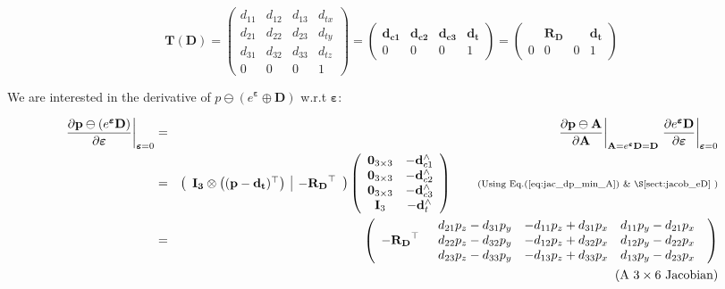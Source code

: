 \documentclass[a4paper,11pt]{report}
\newcommand{\E}{{\bm{\varepsilon}}}
\newcommand{\hatop}[1]{#1^\wedge}
\begin{document}
\begin{equation}
\mathbf{T}(\mathbf{D}) =
\left(
\begin{array}{ccc|c}
 d_{11} & d_{12} & d_{13} & d_{tx}   \\
 d_{21} & d_{22} & d_{23} & d_{ty}   \\
 d_{31} & d_{32} & d_{33} & d_{tz}   \\
\hline
  0 & 0 & 0 & 1
\end{array}
\right)
=
\left(
\begin{array}{ccc|c}
 \mathbf{d_{c1}}  & \mathbf{d_{c2}}  & \mathbf{d_{c3}}  & \mathbf{d_{t}}  \\
\hline
  0 & 0 & 0 & 1
\end{array}
\right)
=
\left(
\begin{array}{ccc|c}
   & \mathbf{R_D}  &  & \mathbf{d_{t}}  \\
\hline
  0 & 0 & 0 & 1
\end{array}
\right)
\end{equation}

We are interested in the derivative of $p \ominus (e^\E \oplus \mathbf{D})$ w.r.t $\E$:

\begin{eqnarray}
\label{eq:jacob_p_min_eD_e}
\left. \frac{\partial \mathbf{p} \ominus (e^\E \mathbf{D}) }{\partial \E} \right|_{\E = 0}
&=&
\left. \frac{\partial \mathbf{p} \ominus \mathbf{A} }{\partial \mathbf{A} } \right|_{\mathbf{A}=e^\E \mathbf{D} = \mathbf{D}}
\left. \frac{\partial e^\E \mathbf{D}}{\partial \E} \right|_{\E=0}
\nonumber \\
&=&
\left(
\begin{array}{c|c}
 \mathbf{I_3} \otimes \left( (\mathbf{p}-\mathbf{d_t})^\top \right)
 &
 -\mathbf{R_D}^\top
\end{array}
\right)
\left(
\begin{array}{cc}
 \mathbf{0}_{3\times 3}  & -\hatop{\mathbf{d}}_{c1} \\
 \mathbf{0}_{3\times 3}  & -\hatop{\mathbf{d}}_{c2} \\
 \mathbf{0}_{3\times 3}  & -\hatop{\mathbf{d}}_{c3} \\
 \mathbf{I}_{3}  & -\hatop{\mathbf{d}}_{t} \\
\end{array}
\right)
\quad\quad \text{\scriptsize{(Using Eq.(\ref{eq:jac_dp_min_A})  \& \S\ref{sect:jacob_eD}} )}
\nonumber \\
&=&
\left(
\begin{array}{cc}
   -\mathbf{R_D}^\top &
  \begin{array}{ccc}
  d_{21} p_z - d_{31} p_y & - d_{11} p_z + d_{31} p_x & d_{11} p_y - d_{21} p_x \\
  d_{22} p_z - d_{32} p_y & - d_{12} p_z + d_{32} p_x & d_{12} p_y - d_{22} p_x \\
  d_{23} p_z - d_{33} p_y & - d_{13} p_z + d_{33} p_x & d_{13} p_y - d_{23} p_x \\
  \end{array}
\end{array}
\right) \\
 && \quad\quad \quad\quad\quad \text{(A $3 \times 6$ Jacobian)} \nonumber
\end{eqnarray}
\end{document}
